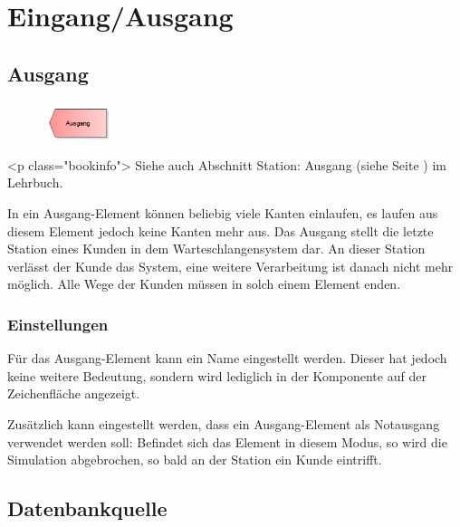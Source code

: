 \chapter{Eingang/Ausgang}

\renewcommand{\thepage}{\arabic{page}}
\setcounter{page}{1}

\section{Ausgang}
\label{ref:ModelElementDispose}

\begin{figure}
\vspace{-22pt}
\includegraphics[width=2cm]{imageModelElementDispose.png}
\vspace{-22pt}
\end{figure}

<p class="bookinfo">
Siehe auch Abschnitt Station: Ausgang (siehe Seite \pageref{ref:book:5.3.4}) im Lehrbuch.

In ein Ausgang-Element können beliebig viele Kanten einlaufen, es laufen aus diesem Element jedoch keine Kanten mehr aus.
Das Ausgang stellt die letzte Station eines Kunden in dem Warteschlangensystem dar. An dieser Station verlässt der Kunde
das System, eine weitere Verarbeitung ist danach nicht mehr möglich. Alle Wege der Kunden müssen in solch einem Element enden.

\subsection*{Einstellungen}

Für das Ausgang-Element kann ein Name eingestellt werden. Dieser hat jedoch keine weitere Bedeutung, sondern wird lediglich
in der Komponente auf der Zeichenfläche angezeigt.

Zusätzlich kann eingestellt werden, dass ein Ausgang-Element als Notausgang verwendet werden soll: Befindet sich das Element
in diesem Modus, so wird die Simulation abgebrochen, so bald an der Station ein Kunde eintrifft.


\section{Datenbankquelle}
\label{ref:ModelElementSourceDB}

